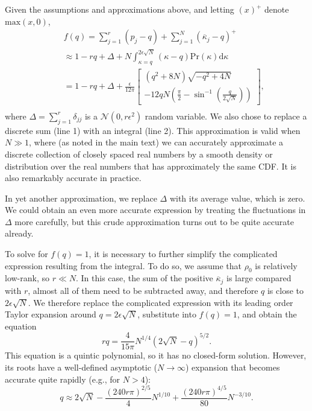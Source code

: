 \documentclass[aps,pra, twocolumn]{revtex4}
\begin{document}
Given the assumptions and approximations above, and letting $(x)^+$ denote $\mathrm{max}(x,0)$, 
\begin{eqnarray}
\nonumber &&f(q) = \sum_{j=1}^{r}(p_j - q) + \sum_{j=1}^{N}{(\overline{\kappa}_j-q)^+} \\
\nonumber &&\approx 1 - rq + \Delta + N\int_{\kappa=q}^{2\epsilon\sqrt{N}}{(\kappa-q)\mathrm{Pr}(\kappa)\mathrm{d}\kappa}\\
&&= 1 - rq + \Delta + \frac{\epsilon}{12\pi}\left[
\begin{array}{l} (q^2+8N)\sqrt{-q^2+4N} \\
-12qN\left(\frac{\pi}{2}-\sin^{-1}\left(\frac{q}{2\sqrt{N}}\right)\right)
\end{array}\right],\nonumber\\
~
\end{eqnarray}
where $\Delta = \sum_{j=1}^{r}\delta_{jj}$ is a $\mathcal{N}(0,r\epsilon^2)$ random variable.  We also chose to replace a discrete 
sum (line 1) with an integral (line 2).  This approximation is valid when $N\gg1$, where (as noted in the main text) we can accurately approximate a discrete collection of closely spaced real numbers by a smooth density or distribution over the real numbers that has approximately the same CDF.  It is also remarkably accurate in practice.
  
In yet another approximation, we replace $\Delta$ with its average value, which is zero.  We could obtain an even more accurate expression 
 by treating the fluctuations in $\Delta$ more carefully, but this crude approximation turns out to be quite accurate already.

To solve for $f(q) = 1$, it is necessary to further simplify the complicated expression resulting from the integral.  To do so, we 
assume that $\rho_0$ is relatively low-rank, so $r \ll N$.  In this case, the sum of the positive $\overline{\kappa}_j$ is large compared 
with $r$, almost all of them need to be subtracted away, and therefore $q$ is close to $2\epsilon\sqrt{N}$.  We therefore replace 
the complicated expression with its leading order Taylor expansion around $q=2\epsilon\sqrt{N}$, substitute into $f(q)=1$, and 
obtain the equation
\begin{equation}
rq  = \frac{4}{15\pi}N^{1/4}\left(2\sqrt{N}-q\right)^{5/2}.
\end{equation}
This equation is a quintic polynomial, so it has no closed-form solution.  However, its roots have a well-defined asymptotic ($N\to
\infty$) expansion that becomes accurate quite rapidly (e.g., for $N>4$):
\begin{equation}
q \approx 2\sqrt{N}-\frac{(240r\pi)^{2/5}}{4}N^{1/10}+\frac{(240r\pi)^{4/5}}{80}N^{-3/10}.
\end{equation}
\end{document}

